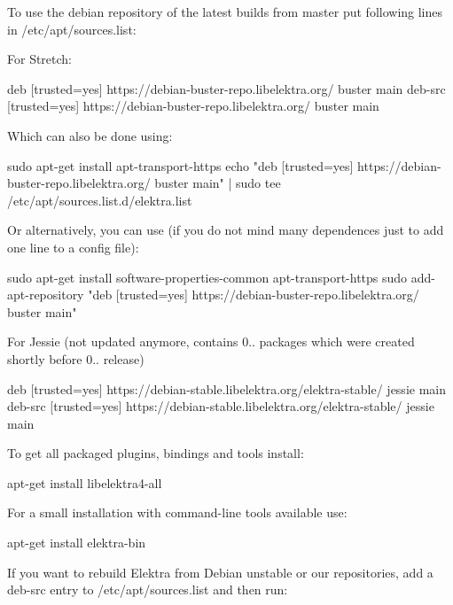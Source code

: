 To use the debian repository of the latest builds from master put following lines in {\ttfamily /etc/apt/sources.list}\+:

For Stretch\+:


\begin{DoxyCode}
deb     [trusted=yes] https://debian-buster-repo.libelektra.org/ buster main
deb-src [trusted=yes] https://debian-buster-repo.libelektra.org/ buster main
\end{DoxyCode}


Which can also be done using\+:


\begin{DoxyCode}
sudo apt-get install apt-transport-https
echo "deb     [trusted=yes] https://debian-buster-repo.libelektra.org/ buster main" | sudo tee
       /etc/apt/sources.list.d/elektra.list
\end{DoxyCode}


Or alternatively, you can use (if you do not mind many dependences just to add one line to a config file)\+:


\begin{DoxyCode}
sudo apt-get install software-properties-common apt-transport-https
sudo add-apt-repository "deb     [trusted=yes] https://debian-buster-repo.libelektra.org/ buster main"
\end{DoxyCode}


For Jessie (not updated anymore, contains 0.. packages which were created shortly before 0.. release)


\begin{DoxyCode}
deb     [trusted=yes] https://debian-stable.libelektra.org/elektra-stable/ jessie main
deb-src [trusted=yes] https://debian-stable.libelektra.org/elektra-stable/ jessie main
\end{DoxyCode}


To get all packaged plugins, bindings and tools install\+:


\begin{DoxyCode}
apt-get install libelektra4-all
\end{DoxyCode}


For a small installation with command-\/line tools available use\+:


\begin{DoxyCode}
apt-get install elektra-bin
\end{DoxyCode}


If you want to rebuild Elektra from Debian unstable or our repositories, add a {\ttfamily deb-\/src} entry to {\ttfamily /etc/apt/sources.list} and then run\+:


